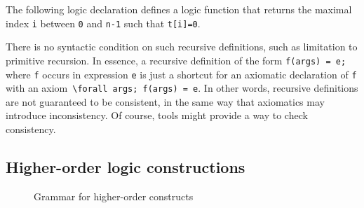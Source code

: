 \begin{example}
  The following logic declaration
  defines a logic function that returns the maximal index \lstinline|i| between
  \lstinline|0| and \lstinline|n-1| such that \lstinline|t[i]=0|.
\end{example}

%  

There is no syntactic condition on such recursive
definitions, such as limitation to primitive recursion. In essence, a
recursive definition of the form \lstinline+f(args) = e;+ where
\lstinline+f+ occurs in expression \lstinline+e+ is just a shortcut
for an axiomatic declaration of \lstinline+f+ with an
axiom~\lstinline+\forall args; f(args) = e+.  In other words, recursive
definitions are not guaranteed to be consistent, in the same way that
axiomatics may introduce inconsistency. Of course, tools might provide
a way to check consistency.

\subsection{Higher-order logic constructions}
\label{sec:higherorder}

\experimental

\begin{figure}[htp]
  \begin{cadre}
      
    \end{cadre}
  \caption{Grammar for higher-order constructs}
\label{fig:gram:higherorder}
\end{figure}


